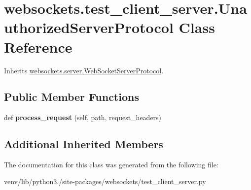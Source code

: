 \hypertarget{classwebsockets_1_1test__client__server_1_1_unauthorized_server_protocol}{}\section{websockets.\+test\+\_\+client\+\_\+server.\+Unauthorized\+Server\+Protocol Class Reference}
\label{classwebsockets_1_1test__client__server_1_1_unauthorized_server_protocol}


Inherits \hyperlink{classwebsockets_1_1server_1_1_web_socket_server_protocol}{websockets.\+server.\+Web\+Socket\+Server\+Protocol}.

\subsection*{Public Member Functions}
\begin{DoxyCompactItemize}
\item 
\mbox{\label{classwebsockets_1_1test__client__server_1_1_unauthorized_server_protocol_a8110ff5ed8717e8889bd4eff66b44553}} 
def {\bfseries process\+\_\+request} (self, path, request\+\_\+headers)
\end{DoxyCompactItemize}
\subsection*{Additional Inherited Members}


The documentation for this class was generated from the following file\+:\begin{DoxyCompactItemize}
\item 
venv/lib/python3./site-\/packages/websockets/test\+\_\+client\+\_\+server.\+py\end{DoxyCompactItemize}
